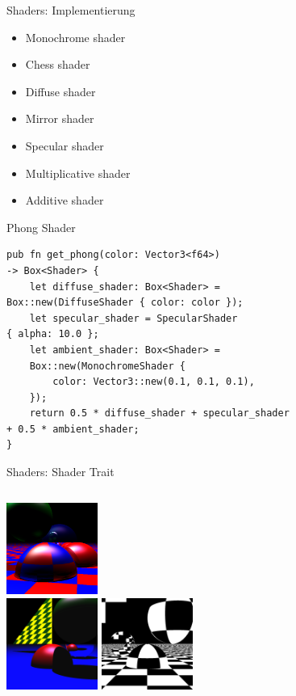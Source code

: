 \documentclass{beamer}
\begin{document}
\begin{frame}{Shaders: Implementierung}
    \begin{itemize}[<+->]
        \item Monochrome shader
        \item Chess shader
        \item Diffuse shader
        \item Mirror shader
        \item Specular shader
        \item Multiplicative shader
        \item Additive shader
    \end{itemize}
\end{frame}

\begin{frame}[fragile]{Phong Shader}
    \begin{lstlisting}
pub fn get_phong(color: Vector3<f64>)
-> Box<Shader> {
    let diffuse_shader: Box<Shader> =
Box::new(DiffuseShader { color: color });
    let specular_shader = SpecularShader
{ alpha: 10.0 };
    let ambient_shader: Box<Shader> =
    Box::new(MonochromeShader {
        color: Vector3::new(0.1, 0.1, 0.1),
    });
    return 0.5 * diffuse_shader + specular_shader
+ 0.5 * ambient_shader;
}
    \end{lstlisting}
\end{frame}

\begin{frame}{Shaders: Shader Trait}
    \begin{columns}[t]
        \centering
        \includegraphics[height=3cm]{example-true-ambiant} \\
        \includegraphics[height=3cm]{example-mirror}
        \centering
        \includegraphics[height=3cm]{example-mirror2}
    \end{columns}
\end{frame}
\end{document}
